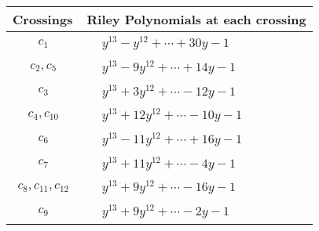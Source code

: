 \documentclass[1p]{elsarticle_modified}
\theoremstyle{definition}
\begin{document}
\begin{tabular}{m{50pt}|m{274pt}}
Crossings & \hspace{64pt}Riley Polynomials at each crossing \\
\hline $$\begin{aligned}c_{1}\end{aligned}$$&$\begin{aligned}
&y^{13}- y^{12}+\cdots+30 y-1
\end{aligned}$\\
\hline $$\begin{aligned}c_{2},c_{5}\end{aligned}$$&$\begin{aligned}
&y^{13}-9 y^{12}+\cdots+14 y-1
\end{aligned}$\\
\hline $$\begin{aligned}c_{3}\end{aligned}$$&$\begin{aligned}
&y^{13}+3 y^{12}+\cdots-12 y-1
\end{aligned}$\\
\hline $$\begin{aligned}c_{4},c_{10}\end{aligned}$$&$\begin{aligned}
&y^{13}+12 y^{12}+\cdots-10 y-1
\end{aligned}$\\
\hline $$\begin{aligned}c_{6}\end{aligned}$$&$\begin{aligned}
&y^{13}-11 y^{12}+\cdots+16 y-1
\end{aligned}$\\
\hline $$\begin{aligned}c_{7}\end{aligned}$$&$\begin{aligned}
&y^{13}+11 y^{12}+\cdots-4 y-1
\end{aligned}$\\
\hline $$\begin{aligned}c_{8},c_{11},c_{12}\end{aligned}$$&$\begin{aligned}
&y^{13}+9 y^{12}+\cdots-16 y-1
\end{aligned}$\\
\hline $$\begin{aligned}c_{9}\end{aligned}$$&$\begin{aligned}
&y^{13}+9 y^{12}+\cdots-2 y-1
\end{aligned}$\\
\hline
\end{tabular}\\~\\
\end{document}
